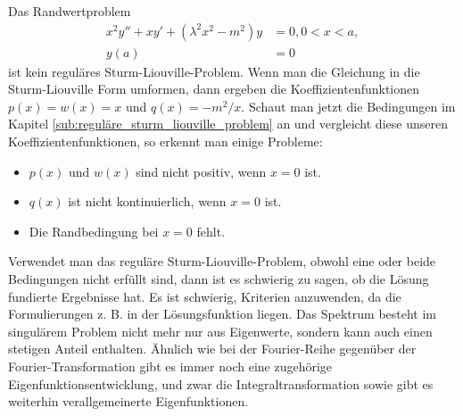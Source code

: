 \begin{beispiel}
	Das Randwertproblem
	\begin{equation}
		\begin{aligned}
		x^2y'' + xy' + (\lambda^2x^2 - m^2)y &= 0, 0<x<a,\\
		y(a) &= 0
		\end{aligned}
	\end{equation}
	ist kein reguläres Sturm-Liouville-Problem.
	Wenn man die Gleichung in die Sturm-Liouville Form umformen, dann ergeben die Koeffizientenfunktionen $p(x) = w(x) = x$ und $q(x) = -m^2/x$.
	Schaut man jetzt die Bedingungen im Kapitel \ref{sub:reguläre_sturm_liouville_problem} an und vergleicht diese unseren Koeffizientenfunktionen, so erkennt man einige Probleme:
	\begin{itemize}
		\item $p(x)$ und $w(x)$ sind nicht positiv, wenn $x = 0$ ist.
		\item $q(x)$ ist nicht kontinuierlich, wenn $x = 0$ ist.
		\item Die Randbedingung bei $x = 0$ fehlt.
	\end{itemize}
\end{beispiel}

Verwendet man das reguläre Sturm-Liouville-Problem, obwohl eine oder beide Bedingungen nicht erfüllt sind, dann ist es schwierig zu sagen, ob die Lösung fundierte Ergebnisse hat.
Es ist schwierig, Kriterien anzuwenden, da die Formulierungen z. B. in der Lösungsfunktion liegen.
Das Spektrum besteht im singulärem Problem nicht mehr nur aus Eigenwerte, sondern kann auch einen stetigen Anteil enthalten.
Ähnlich wie bei der Fourier-Reihe gegenüber der Fourier-Transformation gibt es immer noch eine zugehörige Eigenfunktionsentwicklung, und zwar die Integraltransformation sowie gibt es weiterhin verallgemeinerte Eigenfunktionen.

 



